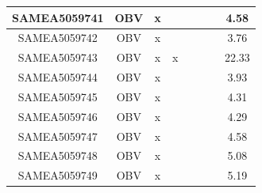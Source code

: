 \documentclass[../main.tex]{subfiles}
\begin{document}
\begin{flushleft}
\begin{footnotesize}
\begin{longtable}{|c|c|c|c|c|c|c|}
    \hline
    SAMEA5059741  & OBV   & x                                                            & ~          & ~                                                                           & ~                                                                 & 4.58      \\ 
    \hline
    SAMEA5059742  & OBV   & x                                                            & ~          & ~                                                                           & ~                                                                 & 3.76      \\ 
    \hline
    SAMEA5059743  & OBV   & x                                                            & x          & ~                                                                           & ~                                                                 & 22.33     \\ 
    \hline
    SAMEA5059744  & OBV   & x                                                            & ~          & ~                                                                           & ~                                                                 & 3.93      \\ 
    \hline
    SAMEA5059745  & OBV   & x                                                            & ~          & ~                                                                           & ~                                                                 & 4.31      \\ 
    \hline
    SAMEA5059746  & OBV   & x                                                            & ~          & ~                                                                           & ~                                                                 & 4.29      \\ 
    \hline
    SAMEA5059747  & OBV   & x                                                            & ~          & ~                                                                           & ~                                                                 & 4.58      \\ 
    \hline
    SAMEA5059748  & OBV   & x                                                            & ~          & ~                                                                           & ~                                                                 & 5.08      \\ 
    \hline
    SAMEA5059749  & OBV   & x                                                            & ~          & ~                                                                           & ~                                                                 & 5.19      \\ 

\end{longtable}
\end{footnotesize}
\end{flushleft}
\end{document}
